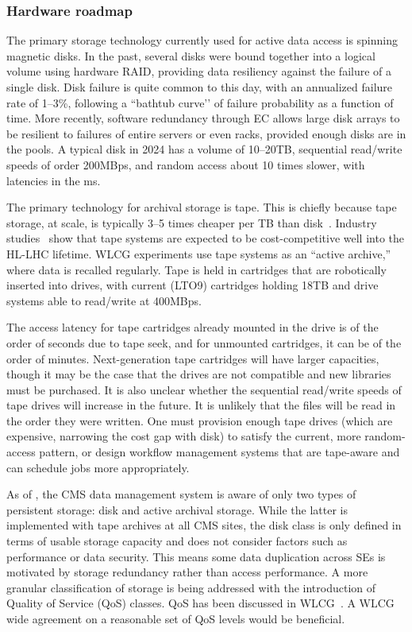\subsubsection{Hardware roadmap}
\label{sec:hardware_roadmap}

The primary storage technology currently used for active data access is spinning magnetic disks. In the past, several disks were bound together into a logical volume using hardware RAID, providing data resiliency against the failure of a single disk. Disk failure is quite common to this day, with an annualized failure rate of 1--3\%, following a ``bathtub curve’’ of failure probability as a function of time. More recently, software redundancy through \gls{EC} allows large disk arrays to be resilient to failures of entire servers or even racks, provided enough disks are in the pools. A typical disk in 2024 has a volume of 10--20\unit{TB}, sequential read/write speeds of order 200\unit{MBps}, and random access about 10 times slower, with latencies in the ms.

The primary technology for archival storage is tape. This is chiefly because tape storage, at scale, is typically 3--5 times cheaper per TB than disk~\cite{TapeTech}. Industry studies~\cite{INSIC} show that tape systems are expected to be cost-competitive well into the \gls{HL-LHC} lifetime. \gls{WLCG} experiments use tape systems as an ``active archive,'' where data is recalled regularly. Tape is held in cartridges that are robotically inserted into drives, with current (LTO9) cartridges holding 18\unit{TB} and drive systems able to read/write at 400\unit{MBps}. 

The access latency for tape cartridges already mounted in the drive is of the order of seconds due to tape seek, and for unmounted cartridges, it can be of the order of minutes. Next-generation tape cartridges will have larger capacities, though it may be the case that the drives are not compatible and new libraries must be purchased. It is also unclear whether the sequential read/write speeds of tape drives will increase in the future. It is unlikely that the files will be read in the order they were written. One must provision enough tape drives (which are expensive, narrowing the cost gap with disk) to satisfy the current, more random-access pattern, or design workflow management systems that are tape-aware and can schedule jobs more appropriately.

As of \RunThree, the CMS data management system is aware of only two types of persistent storage: disk and active archival storage. While the latter is implemented with tape archives at all CMS \TierOne sites, the disk class is only defined in terms of usable storage capacity and does not consider factors such as performance or data security. 
This means some data duplication across SEs is motivated by storage redundancy rather than access performance. A more granular classification of storage is being addressed with the introduction of Quality of Service (QoS) classes. QoS has been discussed in \gls{WLCG}~\cite{qos_whitepaper}. A \gls{WLCG} wide agreement on a reasonable set of QoS levels would be beneficial.

